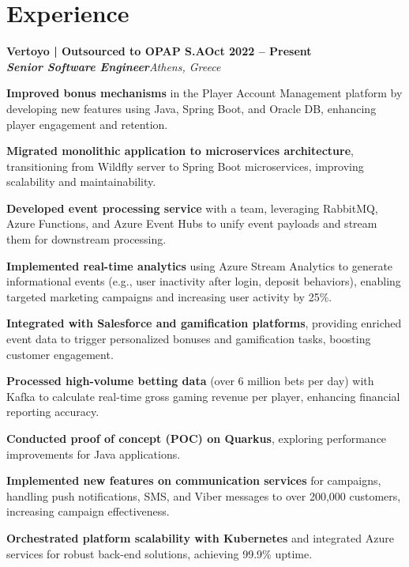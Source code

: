 \documentclass[letterpaper,10pt]{article}
\newcommand{\heading}[2]{
  \hspace{10pt}#1\hfill#2\\
}
\newcommand{\headingBf}[2]{
  \heading{\textbf{#1}}{\textbf{#2}}
}
\newcommand{\headingIt}[2]{
  \heading{\textit{#1}}{\textit{#2}}
}
\newenvironment{resume_list}{
  \vspace{-7pt}
  \begin{itemize}[itemsep=-2px, parsep=1pt, leftmargin=30pt]
}{
  \end{itemize}
}
\begin{document}

  \section{Experience}
 
  \headingBf{\Large Vertoyo | Outsourced to OPAP S.A}{Oct 2022 -- Present}
  \headingIt{\large \textbf{Senior Software Engineer}}{Athens, Greece}
  \begin{resume_list}

  \item \textbf{Improved bonus mechanisms} in the Player Account Management platform by developing new features using Java, Spring Boot, and Oracle DB, enhancing player engagement and retention.
  
  \item \textbf{Migrated monolithic application to microservices architecture}, transitioning from Wildfly server to Spring Boot microservices, improving scalability and maintainability.
  \item \textbf{Developed event processing service} with a team, leveraging RabbitMQ, Azure Functions, and Azure Event Hubs to unify event payloads and stream them for downstream processing.
  
  \item \textbf{Implemented real-time analytics} using Azure Stream Analytics to generate informational events (e.g., user inactivity after login, deposit behaviors), enabling targeted marketing campaigns and increasing user activity by 25\%.
  
  \item \textbf{Integrated with Salesforce and gamification platforms}, providing enriched event data to trigger personalized bonuses and gamification tasks, boosting customer engagement.
  
  \item \textbf{Processed high-volume betting data} (over 6 million bets per day) with Kafka to calculate real-time gross gaming revenue per player, enhancing financial reporting accuracy.
  
  \item \textbf{Conducted proof of concept (POC) on Quarkus}, exploring performance improvements for Java applications.
  
  \item \textbf{Implemented new features on communication services} for campaigns, handling push notifications, SMS, and Viber messages to over 200,000 customers, increasing campaign effectiveness.
  
  \item \textbf{Orchestrated platform scalability with Kubernetes} and integrated Azure services for robust back-end solutions, achieving 99.9\% uptime.
\end{resume_list}
\end{document}
